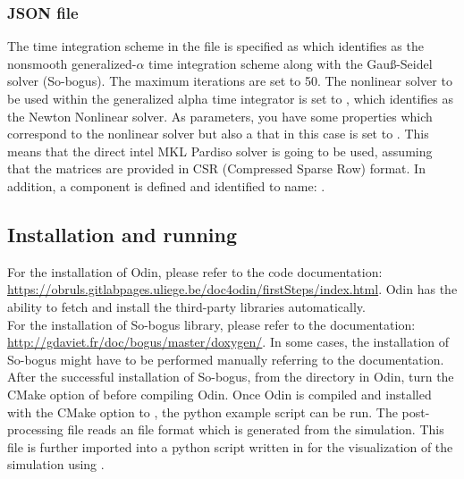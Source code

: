\subsubsection{JSON file}
The time integration scheme in the  file is specified as  which identifies as the nonsmooth generalized-$\alpha$ time integration scheme along with the Gau{\ss}-Seidel solver (So-bogus). The maximum iterations are set to 50. The nonlinear solver to be used within the generalized alpha time integrator is set to , which identifies as the Newton Nonlinear solver. As parameters, you have some properties which correspond to the nonlinear solver but also a  that in this case is set to . This means that the direct intel MKL Pardiso solver is going to be used, assuming that the matrices are provided in CSR (Compressed Sparse Row) format. In addition, a component  is defined and identified to name: .

\subsection{Installation and running}
For the installation of Odin, please refer to the code documentation: \url{https://obruls.gitlabpages.uliege.be/doc4odin/firstSteps/index.html}. Odin has the ability to fetch and install the third-party libraries automatically.\\

For the installation of So-bogus library, please refer to the documentation: \url{http://gdaviet.fr/doc/bogus/master/doxygen/}. In some cases, the installation of So-bogus might have to be performed manually referring to the documentation. After the successful installation of So-bogus, from the  directory in Odin, turn  the CMake option of  before compiling Odin. Once Odin is compiled and installed with the CMake option  to , the python example script can be run. The post-processing file reads an  file format which is generated from the simulation. This  file is further imported into a python script written in  for the visualization of the simulation using .

